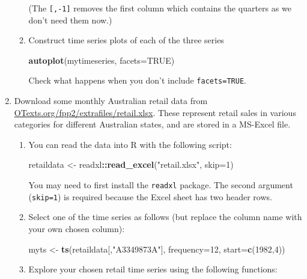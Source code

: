 \documentclass[]{book}
\newenvironment{Shaded}{\begin{snugshade}}{\end{snugshade}}
\newcommand{\DataTypeTok}[1]{\textcolor[rgb]{0.13,0.29,0.53}{#1}}
\newcommand{\DecValTok}[1]{\textcolor[rgb]{0.00,0.00,0.81}{#1}}
\newcommand{\KeywordTok}[1]{\textcolor[rgb]{0.13,0.29,0.53}{\textbf{#1}}}
\newcommand{\NormalTok}[1]{#1}
\newcommand{\OperatorTok}[1]{\textcolor[rgb]{0.81,0.36,0.00}{\textbf{#1}}}
\newcommand{\OtherTok}[1]{\textcolor[rgb]{0.56,0.35,0.01}{#1}}
\newcommand{\StringTok}[1]{\textcolor[rgb]{0.31,0.60,0.02}{#1}}
\begin{document}
\begin{enumerate}
\begin{enumerate}
    (The \texttt{{[},-1{]}} removes the first column which contains the quarters as we don't need them now.)
  \item
    Construct time series plots of each of the three series

\begin{Shaded}
\begin{Highlighting}[]
\KeywordTok{autoplot}\NormalTok{(mytimeseries, }\DataTypeTok{facets=}\OtherTok{TRUE}\NormalTok{)}
\end{Highlighting}
\end{Shaded}

    Check what happens when you don't include \texttt{facets=TRUE}.
  \end{enumerate}
\item
  Download some monthly Australian retail data from \href{extrafiles/retail.xlsx}{OTexts.org/fpp2/extrafiles/retail.xlsx}. These represent retail sales in various categories for different Australian states, and are stored in a MS-Excel file.

  \begin{enumerate}
  \def\labelenumii{\alph{enumii}.}
  \item
    You can read the data into R with the following script:

\begin{Shaded}
\begin{Highlighting}[]
\NormalTok{retaildata <-}\StringTok{ }\NormalTok{readxl}\OperatorTok{::}\KeywordTok{read_excel}\NormalTok{(}\StringTok{"retail.xlsx"}\NormalTok{, }\DataTypeTok{skip=}\DecValTok{1}\NormalTok{)}
\end{Highlighting}
\end{Shaded}

    You may need to first install the \texttt{readxl} package. The second argument (\texttt{skip=1}) is required because the Excel sheet has two header rows.
  \item
    Select one of the time series as follows (but replace the column name with your own chosen column):

\begin{Shaded}
\begin{Highlighting}[]
\NormalTok{myts <-}\StringTok{ }\KeywordTok{ts}\NormalTok{(retaildata[,}\StringTok{"A3349873A"}\NormalTok{], }\DataTypeTok{frequency=}\DecValTok{12}\NormalTok{, }\DataTypeTok{start=}\KeywordTok{c}\NormalTok{(}\DecValTok{1982}\NormalTok{,}\DecValTok{4}\NormalTok{))}
\end{Highlighting}
\end{Shaded}
  \item
    Explore your chosen retail time series using the following functions:


\end{enumerate}
\end{enumerate}
\end{document}
